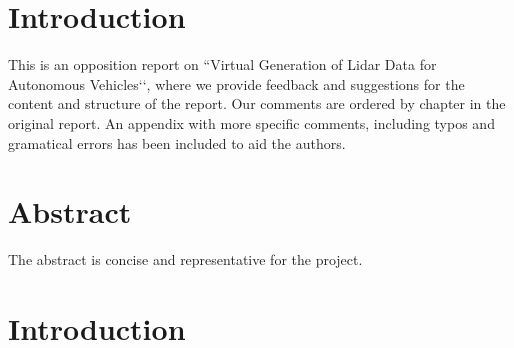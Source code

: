 \documentclass[12pt,a4paper,twoside,openright]{report}
\begin{document}
 


\newcommand{\varHeadline}{Opponering av DATX02-17-10}
\newcommand{\varSubtitle}{Av DATX02-17-12}
\newcommand{\varDepartment}{Department of Computer Science and Engineering}
\newcommand{\varNames}{André Perzon, Björn Strömberg, Chi Thong Luong,  \\
Elias Forsberg, Jesper Åberg, Jon Johnsson}




\section*{Introduction}
	
	This is an opposition report on ``Virtual Generation of Lidar Data for
	Autonomous Vehicles‘‘, where we provide feedback and suggestions for the
	content and structure of the report. Our comments are ordered by chapter in
	the original report. An appendix with more specific comments, including
	typos and gramatical errors has been included to aid the authors.

\section*{Abstract}

	The abstract is concise and representative for the project.

\section*{Introduction}
\end{document}
